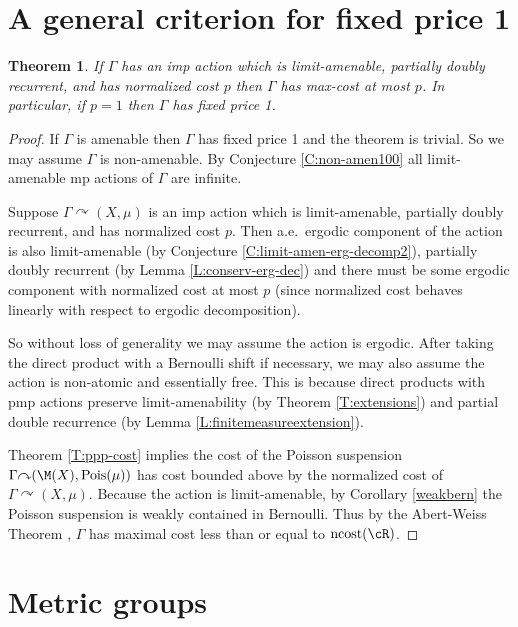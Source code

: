 \documentclass[12pt]{article}
\theoremstyle{plain}
\newtheorem{thm}{Theorem}[section]
\theoremstyle{definition}
\theoremstyle{remark}
\newcommand{\G}{\Gamma}
\newcommand\Pois{\operatorname{Pois}}
\def\cc{{\curvearrowright}}
\begin{document}
\section{A general criterion for fixed price 1}\label{S:general}




\begin{thm}\label{T:general}
    If $\G$ has an imp action   which is limit-amenable, partially doubly recurrent, and has normalized cost $p$ then $\G$ has max-cost at most $p$. In particular, if $p=1$ then $\G$ has fixed price 1.
\end{thm}

\begin{proof}

 If $\G$ is amenable then $\G$ has fixed price 1 and the theorem is trivial. So we may assume $\G$ is non-amenable. By Conjecture \ref{C:non-amen100} all limit-amenable mp actions of $\G$ are infinite. 
 
Suppose $\G \cc (X,\mu)$ is an imp action which is limit-amenable, partially doubly recurrent, and has normalized cost $p$. Then a.e.\ ergodic component of the action is also limit-amenable (by Conjecture \ref{C:limit-amen-erg-decomp2}), partially doubly recurrent (by Lemma \ref{L:conserv-erg-dec}) and there must be some ergodic component with normalized cost at most $p$ (since normalized cost behaves linearly with respect to ergodic decomposition). 


So without loss of generality we may assume the action is ergodic. After taking the direct product with a Bernoulli shift if necessary, we may also assume the action is non-atomic and essentially free. This is because direct products with pmp actions preserve limit-amenability (by Theorem \ref{T:extensions}) and partial double recurrence (by Lemma \ref{L:finitemeasureextension}).

Theorem \ref{T:ppp-cost} implies the cost of the Poisson suspension  $\G \cc (\M(X), \Pois(\mu))$ has cost bounded above by the normalized cost of $\G \cc (X, \mu)$. Because the action is limit-amenable, by Corollary \ref{weakbern} the Poisson suspension is weakly contained in Bernoulli. Thus by the Abert-Weiss Theorem \cite{abert-weiss-2013}, $\G$ has maximal cost less than or equal to $\text{ncost}(\cR)$.   
\end{proof}


\section{Metric groups}\label{S:Metric-groups}
\end{document}
